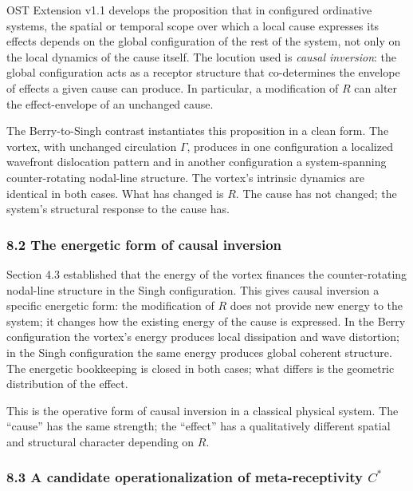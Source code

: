 \documentclass[
  11pt,
  a4paper,
]{article}
\begin{document}
OST Extension v1.1 develops the proposition that in configured
ordinative systems, the spatial or temporal scope over which a local
cause expresses its effects depends on the global configuration of the
rest of the system, not only on the local dynamics of the cause itself.
The locution used is \emph{causal inversion}: the global configuration
acts as a receptor structure that co-determines the envelope of effects
a given cause can produce. In particular, a modification of \(R\) can
alter the effect-envelope of an unchanged cause.

The Berry-to-Singh contrast instantiates this proposition in a clean
form. The vortex, with unchanged circulation \(\Gamma\), produces in one
configuration a localized wavefront dislocation pattern and in another
configuration a system-spanning counter-rotating nodal-line structure.
The vortex's intrinsic dynamics are identical in both cases. What has
changed is \(R\). The cause has not changed; the system's structural
response to the cause has.

\subsubsection{8.2 The energetic form of causal
inversion}\label{the-energetic-form-of-causal-inversion}

Section 4.3 established that the energy of the vortex finances the
counter-rotating nodal-line structure in the Singh configuration. This
gives causal inversion a specific energetic form: the modification of
\(R\) does not provide new energy to the system; it changes how the
existing energy of the cause is expressed. In the Berry configuration
the vortex's energy produces local dissipation and wave distortion; in
the Singh configuration the same energy produces global coherent
structure. The energetic bookkeeping is closed in both cases; what
differs is the geometric distribution of the effect.

This is the operative form of causal inversion in a classical physical
system. The ``cause'' has the same strength; the ``effect'' has a
qualitatively different spatial and structural character depending on
\(R\).

\subsubsection{\texorpdfstring{8.3 A candidate operationalization of
meta-receptivity
\(C^*\)}{8.3 A candidate operationalization of meta-receptivity C\^{}*}}\label{a-candidate-operationalization-of-meta-receptivity-c}
\end{document}
